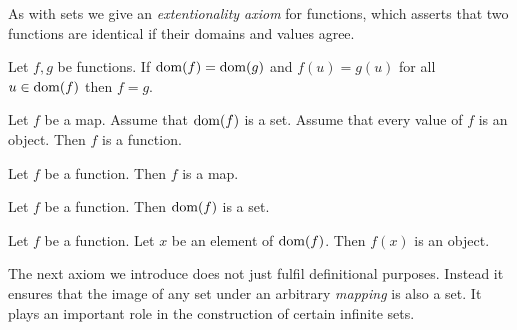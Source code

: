 \documentclass[../../set-theory.ftl.tex]{subfiles}
\begin{document}
  \noindent As with sets we give an \textit{extentionality axiom} for functions, which
  asserts that two functions are identical if their domains and values agree.

  \begin{forthel}
    \begin{axiom}\label{SetTheory_02_01_200419}
      Let $f,g$ be functions.
      If $\operatorname{dom}(f) = \operatorname{dom}(g)$ and $f(u) = g(u)$ for all $u \in \operatorname{dom}(f)$ then $f = g$.
    \end{axiom}
  \end{forthel}


  \begin{forthel}
    \begin{axiom}
      Let $f$ be a map.
      Assume that $\operatorname{dom}(f)$ is a set.
      Assume that every value of $f$ is an object.
      Then $f$ is a function.
    \end{axiom}

    \begin{axiom}
      Let $f$ be a function.
      Then $f$ is a map.
    \end{axiom}

    \begin{axiom}
      Let $f$ be a function.
      Then $\operatorname{dom}(f)$ is a set.
    \end{axiom}

    \begin{axiom}
      Let $f$ be a function.
      Let $x$ be an element of $\operatorname{dom}(f)$.
      Then $f(x)$ is an object.
    \end{axiom}
  \end{forthel}

  \noindent The next axiom we introduce does not just fulfil definitional
  purposes.
  Instead it ensures that the image of any set under an arbitrary
  \textit{mapping} is also a set.
  It plays an important role in the construction of certain infinite sets.
\end{document}

